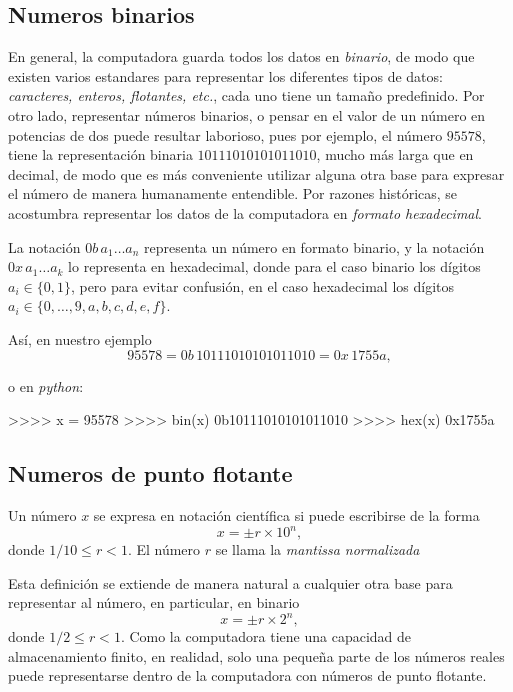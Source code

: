 \documentclass[spanish]{amsart}
\begin{document}
\subsection{Numeros binarios}
En general, la computadora guarda todos los datos en \emph{binario}, de modo que existen varios estandares para representar los diferentes tipos de datos: \emph{caracteres, enteros, flotantes, etc.}, cada uno tiene un tamaño predefinido. Por otro lado, representar números binarios, o pensar en el valor de un número en potencias de dos puede resultar laborioso, pues por ejemplo, el número $95578$, tiene la representación binaria $10111010101011010$, mucho más larga que en decimal, de modo que es más conveniente utilizar alguna otra base para expresar el número de manera humanamente entendible. Por razones históricas, se acostumbra representar los datos de la computadora en \emph{formato hexadecimal}.

\begin{definition}
  La notación $0b\,a_1\ldots a_n$ representa un número en formato binario, y la notación $0x\,a_1\ldots a_k$ lo representa en hexadecimal, donde para el caso binario los dígitos $a_i \in \{0, 1\}$, pero para evitar confusión, en el caso hexadecimal los dígitos $a_i \in \{0,  \ldots, 9, a, b, c, d, e, f\}$.
\end{definition}

Así, en nuestro ejemplo
\[95578 = 0b\,10111010101011010 = 0x\,1755a,\]

o en \emph{python}:

\begin{pyconcode}
  >>>> x = 95578
  >>>> bin(x)
  0b10111010101011010
  >>>> hex(x)
  0x1755a
\end{pyconcode}

\subsection{Numeros de punto flotante}
\begin{definition}
  Un número $x$ se expresa en notación científica si puede escribirse de la forma 
\[x = \pm r \times 10^n,\]
donde $1/10 \leq r < 1$. El número $r$ se llama la \emph{mantissa normalizada}
\end{definition}

Esta definición se extiende de manera natural a cualquier otra base para representar al número, en particular, en binario
\[x = \pm r \times 2^n,\]
donde $1/2 \leq r < 1$. Como la computadora tiene una capacidad de almacenamiento finito, en realidad, solo una pequeña parte de los números reales puede representarse dentro de la computadora con números de punto flotante.
\end{document}

